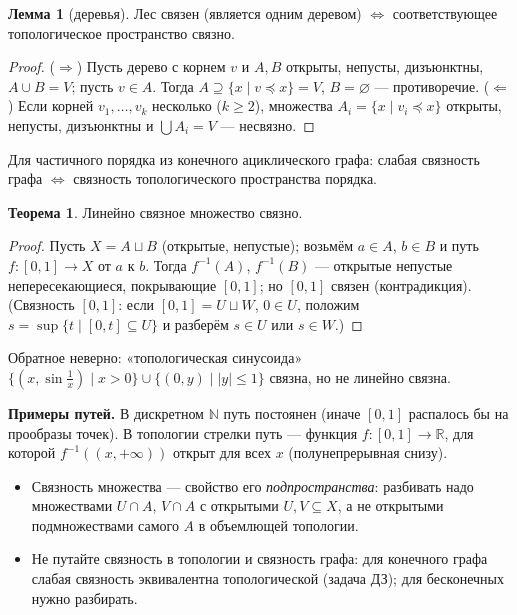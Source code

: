 \documentclass[11pt,a4paper]{article}
\newcommand{\bbR}{\mathbb{R}}
\theoremstyle{definition}
\newtheorem*{thm}{Теорема}
\newtheorem*{lmm}{Лемма}
\begin{document}
\begin{lmm}[деревья]
Лес связен (является одним деревом) $\iff$ соответствующее топологическое пространство связно.
\end{lmm}
\begin{proof}
($\Rightarrow$) Пусть дерево с корнем $v$ и $A,B$ открыты, непусты, дизъюнктны, $A\cup B=V$; пусть $v\in A$. Тогда $A\supseteq\{x\mid v\preceq x\}=V$, $B=\varnothing$ --- противоречие.
($\Leftarrow$) Если корней $v_1,\dots,v_k$ несколько ($k\ge2$), множества $A_i=\{x\mid v_i\preceq x\}$ открыты, непусты, дизъюнктны и $\bigcup A_i=V$ --- несвязно.
\end{proof}
Для частичного порядка из конечного ациклического графа: слабая связность графа $\iff$ связность топологического пространства порядка.

\begin{thm}
Линейно связное множество связно.
\end{thm}
\begin{proof}
Пусть $X=A\sqcup B$ (открытые, непустые); возьмём $a\in A$, $b\in B$ и путь $f:[0,1]\to X$ от $a$ к $b$. Тогда $f^{-1}(A)$, $f^{-1}(B)$ --- открытые непустые непересекающиеся, покрывающие $[0,1]$; но $[0,1]$ связен (контрадикция). (Связность $[0,1]$: если $[0,1]=U\sqcup W$, $0\in U$, положим $s=\sup\{t\mid[0,t]\subseteq U\}$ и разберём $s\in U$ или $s\in W$.)
\end{proof}
Обратное неверно: «топологическая синусоида» $\{(x,\sin\frac1x)\mid x>0\}\cup\{(0,y)\mid|y|\le1\}$ связна, но не линейно связна.

\textbf{Примеры путей.} В дискретном $\mathbb{N}$ путь постоянен (иначе $[0,1]$ распалось бы на прообразы точек). В топологии стрелки путь --- функция $f:[0,1]\to\bbR$, для которой $f^{-1}((x,+\infty))$ открыт для всех $x$ (полунепрерывная снизу).

\begin{warn}
\begin{itemize}
\item Связность множества --- свойство его \emph{подпространства}: разбивать надо множествами $U\cap A$, $V\cap A$ с открытыми $U,V\subseteq X$, а не открытыми подмножествами самого $A$ в объемлющей топологии.
\item Не путайте связность в топологии и связность графа: для конечного графа слабая связность эквивалентна топологической (задача ДЗ); для бесконечных нужно разбирать.
\end{itemize}
\end{warn}
\end{document}
